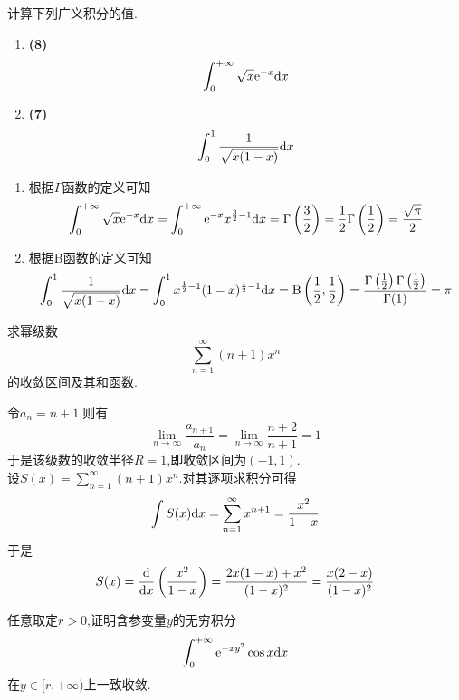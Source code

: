 \documentclass{ctexart}
\begin{document}
\begin{problem}[2.(15\songti{分})]
    计算下列广义积分的值.
    \begin{enumerate}[label=\tbf{(\arabic*)},topsep=0pt,parsep=0pt,itemsep=0pt,partopsep=0pt]
        \item \textbf{(8)}
            \[\int_0^{+\infty}\sqrt{x}\mathrm{e}^{-x}\mathrm{d} x\]
        \item \textbf{(7)}\ 
            \[\int_0^1\dfrac{1}{\sqrt{x(1-x)}}\mathrm{d} x\]
    \end{enumerate}

\end{problem}
\begin{solution}
    \begin{enumerate}[label=\tbf{(\arabic*)},topsep=0pt,parsep=0pt,itemsep=0pt,partopsep=0pt]
        \item 根据$\Gamma$函数的定义可知
            \[\int_0^{+\infty}\sqrt{x}\mathrm{e}^{-x}\mathrm{d} x
            =\int_{0}^{+\infty}\mathrm{e}^{-x}x^{\frac32-1}\mathrm{d} x
            =\Gamma\left(\dfrac32\right)
            =\dfrac12\Gamma\left(\dfrac12\right)
            =\dfrac{\sqrt\pi}{2}\]
        \item 根据B函数的定义可知
            \[\int_0^1\dfrac{1}{\sqrt{x(1-x)}}\mathrm{d} x
            =\int_0^1x^{\frac12-1}(1-x)^{\frac12-1}\mathrm{d} x
            =\text{B}\left(\dfrac12,\dfrac12\right)
            =\dfrac{\Gamma\left(\frac12\right)\Gamma\left(\frac12\right)}{\Gamma(1)}
            =\pi\]

    \end{enumerate}
\end{solution}
\begin{problem}[3.(15\songti{分})]
    求幂级数
    \[\sum_{n=1}^{\infty}(n+1)x^n\]
    的收敛区间及其和函数.

\end{problem}
\begin{solution}
    令$a_n=n+1$,则有
    \[\lim_{n\to\infty}\dfrac{a_{n+1}}{a_n}=\lim_{n\to\infty}\dfrac{n+2}{n+1}=1\]
    于是该级数的收敛半径$R=1$,即收敛区间为$(-1,1)$.\\
    设$S(x)=\displaystyle\sum_{n=1}^{\infty}(n+1)x^n$.对其逐项求积分可得
    \[\int S(x)\mathrm{d} x=\sum_{n=1}^{\infty}x^{n+1}=\dfrac{x^2}{1-x}\]
    于是
    \[S(x)=\dfrac{\mathrm{d}}{\mathrm{d} x}\left(\dfrac{x^2}{1-x}\right)=\dfrac{2x(1-x)+x^2}{(1-x)^2}=\dfrac{x(2-x)}{(1-x)^2}\]

\end{solution}
\begin{problem}[4.(15\songti{分})]
    任意取定$r>0$,证明含参变量$y$的无穷积分
    \[\int_0^{+\infty}\mathrm{e}^{-xy^2}\cos x\mathrm{d} x\]
    在$y\in[r,+\infty)$上一致收敛.
        
\end{problem}
\end{document}
